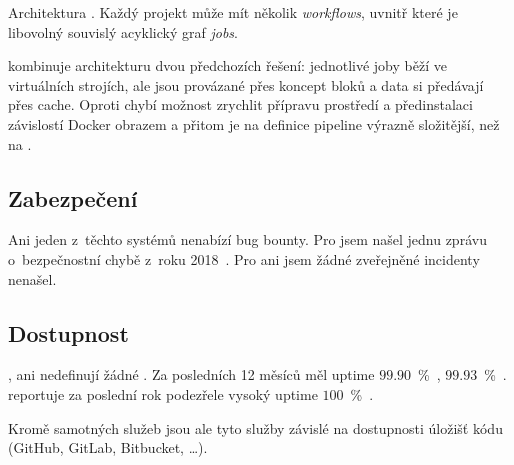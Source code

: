          \begin{iffigure}
            \centering
            \caption{Architektura \circleci. Každý projekt může mít několik \textit{workflows}, uvnitř které je libovolný souvislý acyklický graf \textit{jobs}.}
            \label{pic:circle-architecture}
        \end{iffigure}

        \semaphore kombinuje architekturu dvou předchozích řešení: jednotlivé joby běží ve virtuálních strojích, ale jsou provázané přes koncept bloků a data si předávají přes cache. Oproti \circleci chybí možnost zrychlit přípravu prostředí a předinstalaci závislostí Docker obrazem a přitom je na \semaphore definice pipeline výrazně složitější, než na \travis.

    \subsection{Zabezpečení}
        Ani jeden z~těchto  \CI systémů nenabízí bug bounty. Pro \travis jsem našel jednu zprávu o~bezpečnostní chybě z~roku 2018~\cite{travis-db-drop}. Pro \circleci ani \semaphore jsem žádné zveřejněné incidenty nenašel.

    \subsection{Dostupnost}
        \circleci, \travis ani \semaphore nedefinují žádné . Za posledních 12 měsíců měl \circleci uptime $99.90$~\%~\cite{circle-uptime}, \travis $99.93$~\%~\cite{travis-uptime}. \semaphore reportuje za poslední rok podezřele vysoký uptime $100$~\%~\cite{semaphore-uptime}.

        Kromě samotných \CI služeb jsou ale tyto služby závislé na dostupnosti úložišť kódu (GitHub, GitLab, Bitbucket, …).

